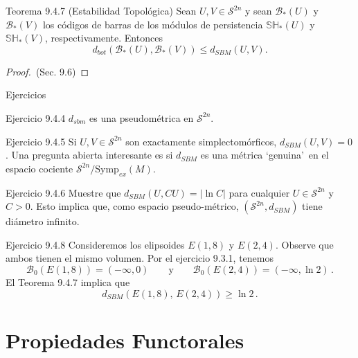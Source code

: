 \documentclass{beamer}
\newcounter{Ejercicio}
\begin{document}
\begin{frame}
\begin{block}{Teorema 9.4.7 (Estabilidad Topol\'ogica)}
Sean $U,V\in \mathcal{S}^{2n}$ y sean $\mathcal{B}_{\ast}(U)$ y $\mathcal{B}_{\ast}(V)$ los c\'odigos de barras de los m\'odulos de persistencia $\mathbb{SH}_{\ast}(U)$ y $\mathbb{SH}_{\ast}(V)$, respectivamente. Entonces
$$d_{bot}(\mathcal{B}_{\ast}(U),\mathcal{B}_{\ast}(V))\leq d_{SBM} (U,V).$$
\begin{proof}$\,$\hspace{3em}(Sec. 9.6)
\end{proof}
\end{block}
\end{frame}

\begin{frame}{Ejercicios}
\begin{block}{Ejercicio 9.4.4} $d_{sbm}$ es una pseudom\'etrica en $\mathcal{S}^{2n}$.
\end{block}
\vfill
\begin{block}{Ejercicio 9.4.5} Si $U,V\in \mathcal{S}^{2n}$ son exactamente simplectom\'orficos, $d_{SBM}(U,V)=0$. Una pregunta abierta interesante es si $d_{SBM}$ es una m\'etrica \lq genuina\rq ~en el espacio cociente $\mathcal{S}^{2n}/\mbox{Symp}_{ex}(M).$
\end{block}
\vfill
\begin{block}{Ejercicio 9.4.6} Muestre que $d_{SBM}(U,CU)=\big\vert \ln C\big\vert$ para cualquier $U\in\mathcal{S}^{2n}$ y $C>0$. Esto implica que, como espacio pseudo-m\'etrico, $(\mathcal{S}^{2n},d_{SBM})$ tiene di\'ametro infinito.
\end{block}
\end{frame}

\begin{frame}
\begin{block}{Ejercicio 9.4.8}
Consideremos los elipsoides $E(1,8)$ y $E(2,4)$. Observe que ambos tienen el mismo volumen. Por el ejercicio 9.3.1, tenemos
$$\mathcal{B}_0(E(1,8))=(-\infty,0)\hspace{2em}\mbox{y}\hspace{2em}\mathcal{B}_0(E(2,4))=(-\infty,\ln 2)\,.$$
El Teorema 9.4.7 implica que
$$d_{SBM}(E(1,8),\,E(2,4))\geq \ln 2\,.$$
\end{block}
\end{frame}

\section{Propiedades Functorales}
\end{document}
